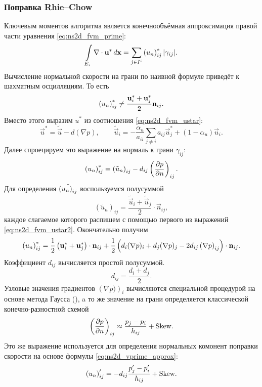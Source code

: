 \subsubsection{Поправка Rhie--Chow}
\label{sec:rhie_chow}
Ключевым моментов алгоритма является конечнообъёмная аппроксимация правой части уравнения
\cref{eq:ns2d_fvm_prime}:
\begin{equation}
\label{eq:ns2d_fvm_div_ustar}
\arint{\nabla\cdot \vec u^*}{E_i}{\vec x} = \sum_{j\in I^i} \unij^* |\gamma_{ij}|.
\end{equation}
Вычисление нормальной скорости на грани по наивной формуле приведёт к шахматным осцилляциям. То есть
\begin{equation*}
\unij^* \neq \frac{\vec u^*_i + \vec u^*_j}{2} \vec n_{ij}.
\end{equation*}
Вместо этого выразим $u^*$ из соотношения \cref{eq:ns2d_fvm_ustar}:
\begin{equation}
\label{eq:ns2d_fvm_ustar2}
\vec u^* = \tilde{\vec u} - d (\nabla p), \qquad
\tilde{\vec u}_i = -\frac{\alpha_u}{a_{ii}}\sum_{j\neq i} a_{ij} \vec u^*_j + \left(1 - \alpha_u\right) \vec u_i.
\end{equation}
Далее спроецируем это выражение на нормаль к грани $\gamma_{ij}$:
\begin{equation*}
\unij^* = \left(\tilde u_n\right)_{ij} - d_{ij} \left(\dfr{p}{n}\right)_{ij}.
\end{equation*}
Для определения $\tilde\unij$ воспользуемся полусуммой
\begin{equation}
\label{eq:ns2d_fvm_utilde_n}
\left(\tilde u_n\right)_{ij} = \frac{\tilde{\vec u}_i + \tilde{\vec u}_j}{2} \cdot \vec n_{ij},
\end{equation}
каждое слагаемое которого распишем с помощью первого из выражений \cref{eq:ns2d_fvm_ustar2}. Окончательно получим
\begin{equation}
\label{eq:ns2d_fvm_unij_star}
\unij^* = \frac12\left(\vec u^*_i + \vec u^*_j\right) \cdot \vec n_{ij} + \frac12\left(d_i(\nabla p)_i + d_j(\nabla p)_j - 2 d_{ij}\left(\nabla p\right)_{ij} \right) \cdot \vec n_{ij}.
\end{equation}
Коэффициент $d_{ij}$ вычисляется простой полусуммой.
\begin{equation*}
d_{ij} = \frac{d_i + d_j}{2}.
\end{equation*}
Узловые значения градиентов $\left(\nabla p)\right)_{i}$ вычисляются
специальной процедурой на основе метода Гаусса (),
a то же значение на грани определяется классической конечно-разностной схемой
\begin{equation*}
\left(\dfr{p}{n}\right)_{ij} \approx \frac{p_j - p_i}{h_{ij}} + \text{Skew}.
\end{equation*}
Это же выражение используется для определения
нормальных комонент поправки скорости на основе формулы \cref{eq:ns2d_vprime_approx}:
\begin{equation}
\label{eq:ns2d_fvm_unij_prime}
\unij' = -d_{ij} \frac{p'_j - p'_i}{h_{ij}} + \text{Skew}.
\end{equation}
